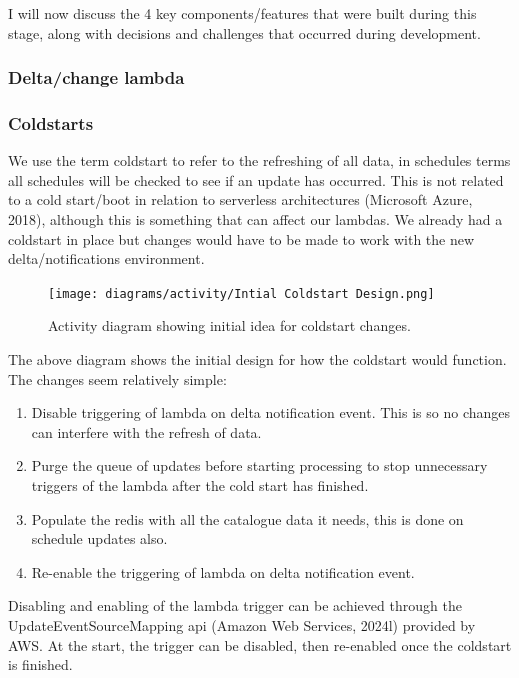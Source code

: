   I will now discuss the 4 key components/features that were built during this stage, along with decisions and challenges that occurred during development.

  \newpage
  \subsubsection{Delta/change lambda}


  \newpage
  \subsubsection{Coldstarts}
  We use the term coldstart to refer to the refreshing of all data, in schedules terms all schedules will be checked to see if an update has occurred.
  This is not related to a cold start/boot in relation to serverless architectures (Microsoft Azure, 2018), although this is something that can affect 
  our lambdas. We already had a coldstart in place but changes would have to be made to work with the new delta/notifications environment.

  \begin{figure}[H]
    \centering
    \texttt{[image: diagrams/activity/Intial Coldstart Design.png]}
    \caption{Activity diagram showing initial idea for coldstart changes.}
    \label{fig:initialColdstart}
  \end{figure}

  The above diagram shows the initial design for how the coldstart would function. The changes seem relatively simple:
  \begin{enumerate}
    \item Disable triggering of lambda on delta notification event. This is so no changes can interfere with the refresh of data.
    \item Purge the queue of updates before starting processing to stop unnecessary triggers of the lambda after the cold start has finished.
    \item Populate the redis with all the catalogue data it needs, this is done on schedule updates also. 
    \item Re-enable the triggering of lambda on delta notification event.
  \end{enumerate}

  Disabling and enabling of the lambda trigger can be achieved through the UpdateEventSourceMapping api (Amazon Web Services, 2024l) provided by AWS. 
  At the start, the trigger can be disabled, then re-enabled once the coldstart is finished.

